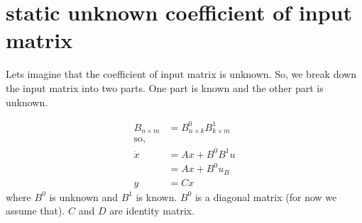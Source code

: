 \documentclass[12pt]{article}
\begin{document}
\section*{static unknown coefficient of input matrix}
Lets imagine that the coefficient of input matrix is unknown. So, we break down the input matrix into two parts. One part is known and the other part is unknown.

\begin{align*}
    B_{n \times m} &= B^{0}_{n \times k} B^{1}_{k \times m} \\ 
    \text{so,}  \\
    \dot{x} &= Ax + B^{0} B^{1} u \\
    &= Ax + B^{0} u_{B} \\
    y &= Cx 
\end{align*}
where $B^{0}$ is unknown and $B^{1}$ is known. $B^{0}$ is a diagonal matrix (for now we assume that). $C$ and $D$ are identity matrix.
\end{document}
